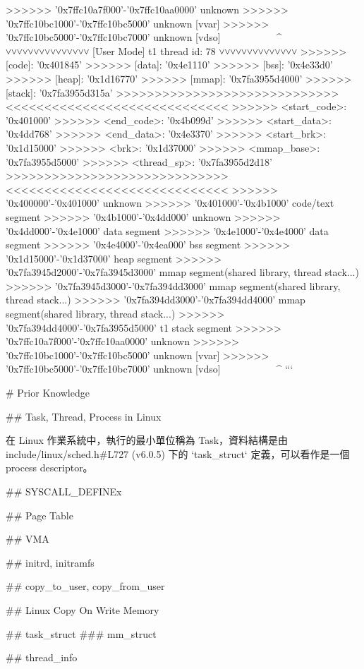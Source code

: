 \documentclass[]{article}
\begin{document}
\begin{markdown}
>>>>>> '0x7ffc10a7f000'-'0x7ffc10aa0000' unknown
>>>>>> '0x7ffc10bc1000'-'0x7ffc10bc5000' unknown [vvar]
>>>>>> '0x7ffc10bc5000'-'0x7ffc10bc7000' unknown [vdso]
^^^^^^^^^^^^^^^^^^^^^^^^^^^^^^^^^^^^^^^^^^^^^^^^^^^^^^^^^^
˅˅˅˅˅˅˅˅˅˅˅˅˅˅˅ [User Mode] t1 thread id: 78 ˅˅˅˅˅˅˅˅˅˅˅˅˅˅
>>>>>> [code]:          '0x401845'
>>>>>> [data]:          '0x4e1110'
>>>>>> [bss]:           '0x4e33d0'
>>>>>> [heap]:          '0x1d16770'
>>>>>> [mmap]:          '0x7fa3955d4000'
>>>>>> [stack]:         '0x7fa3955d315a'
>>>>>>>>>>>>>>>>>>>>>>>>>>>>><<<<<<<<<<<<<<<<<<<<<<<<<<<<<
>>>>>> <start_code>:    '0x401000'
>>>>>> <end_code>:      '0x4b099d'
>>>>>> <start_data>:    '0x4dd768'
>>>>>> <end_data>:      '0x4e3370'
>>>>>> <start_brk>:     '0x1d15000'
>>>>>> <brk>:           '0x1d37000'
>>>>>> <mmap_base>:     '0x7fa3955d5000'
>>>>>> <thread_sp>:     '0x7fa3955d2d18'
>>>>>>>>>>>>>>>>>>>>>>>>>>>>><<<<<<<<<<<<<<<<<<<<<<<<<<<<<
>>>>>> '0x400000'-'0x401000' unknown
>>>>>> '0x401000'-'0x4b1000' code/text segment
>>>>>> '0x4b1000'-'0x4dd000' unknown
>>>>>> '0x4dd000'-'0x4e1000' data segment
>>>>>> '0x4e1000'-'0x4e4000' data segment
>>>>>> '0x4e4000'-'0x4ea000' bss segment
>>>>>> '0x1d15000'-'0x1d37000' heap segment
>>>>>> '0x7fa3945d2000'-'0x7fa3945d3000' mmap segment(shared library, thread stack...)
>>>>>> '0x7fa3945d3000'-'0x7fa394dd3000' mmap segment(shared library, thread stack...)
>>>>>> '0x7fa394dd3000'-'0x7fa394dd4000' mmap segment(shared library, thread stack...)
>>>>>> '0x7fa394dd4000'-'0x7fa3955d5000' t1 stack segment
>>>>>> '0x7ffc10a7f000'-'0x7ffc10aa0000' unknown
>>>>>> '0x7ffc10bc1000'-'0x7ffc10bc5000' unknown [vvar]
>>>>>> '0x7ffc10bc5000'-'0x7ffc10bc7000' unknown [vdso]
^^^^^^^^^^^^^^^^^^^^^^^^^^^^^^^^^^^^^^^^^^^^^^^^^^^^^^^^^^
```

# Prior Knowledge

## Task, Thread, Process in Linux

在 Linux 作業系統中，執行的最小單位稱為 Task，資料結構是由 include/linux/sched.h#L727 (v6.0.5) 下的 `task_struct` 定義，可以看作是一個 process descriptor。

## SYSCALL_DEFINEx

## Page Table

## VMA

## initrd, initramfs

## copy_to_user, copy_from_user

## Linux Copy On Write Memory

## task_struct
### mm_struct

## thread_info


\end{markdown}
\end{document}
